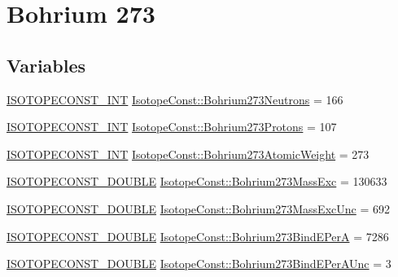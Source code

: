 \hypertarget{group___isotope_const-_bohrium-_bh273}{}\section{Bohrium 273}
\label{group___isotope_const-_bohrium-_bh273}
\subsection*{Variables}
\begin{DoxyCompactItemize}
\item 
\mbox{\hyperlink{group___isotope_const-_macros_ga5f18360b3e99483a35c32d789e62621c}{I\+S\+O\+T\+O\+P\+E\+C\+O\+N\+S\+T\+\_\+\+I\+NT}} \mbox{\hyperlink{group___isotope_const-_bohrium-_bh273_ga2f7fa51ef872b5c4e025e4442e365c8a}{Isotope\+Const\+::\+Bohrium273\+Neutrons}} = 166
\item 
\mbox{\hyperlink{group___isotope_const-_macros_ga5f18360b3e99483a35c32d789e62621c}{I\+S\+O\+T\+O\+P\+E\+C\+O\+N\+S\+T\+\_\+\+I\+NT}} \mbox{\hyperlink{group___isotope_const-_bohrium-_bh273_ga033897448d7788e7ce5f4bf2117a0f76}{Isotope\+Const\+::\+Bohrium273\+Protons}} = 107
\item 
\mbox{\hyperlink{group___isotope_const-_macros_ga5f18360b3e99483a35c32d789e62621c}{I\+S\+O\+T\+O\+P\+E\+C\+O\+N\+S\+T\+\_\+\+I\+NT}} \mbox{\hyperlink{group___isotope_const-_bohrium-_bh273_ga28859630d8dadd8cd270895ba87d6c1b}{Isotope\+Const\+::\+Bohrium273\+Atomic\+Weight}} = 273
\item 
\mbox{\hyperlink{group___isotope_const-_macros_ga8f45a7272ce02c0b4c65c44636ed719a}{I\+S\+O\+T\+O\+P\+E\+C\+O\+N\+S\+T\+\_\+\+D\+O\+U\+B\+LE}} \mbox{\hyperlink{group___isotope_const-_bohrium-_bh273_ga265906a1589c12826012ce2977ab6633}{Isotope\+Const\+::\+Bohrium273\+Mass\+Exc}} = 130633
\item 
\mbox{\hyperlink{group___isotope_const-_macros_ga8f45a7272ce02c0b4c65c44636ed719a}{I\+S\+O\+T\+O\+P\+E\+C\+O\+N\+S\+T\+\_\+\+D\+O\+U\+B\+LE}} \mbox{\hyperlink{group___isotope_const-_bohrium-_bh273_gad4af3af1115bbe3e086f0297dc9b02c8}{Isotope\+Const\+::\+Bohrium273\+Mass\+Exc\+Unc}} = 692
\item 
\mbox{\hyperlink{group___isotope_const-_macros_ga8f45a7272ce02c0b4c65c44636ed719a}{I\+S\+O\+T\+O\+P\+E\+C\+O\+N\+S\+T\+\_\+\+D\+O\+U\+B\+LE}} \mbox{\hyperlink{group___isotope_const-_bohrium-_bh273_ga7611a6a0d62476c6a11b3ee7db3a0c63}{Isotope\+Const\+::\+Bohrium273\+Bind\+E\+PerA}} = 7286
\item 
\mbox{\hyperlink{group___isotope_const-_macros_ga8f45a7272ce02c0b4c65c44636ed719a}{I\+S\+O\+T\+O\+P\+E\+C\+O\+N\+S\+T\+\_\+\+D\+O\+U\+B\+LE}} \mbox{\hyperlink{group___isotope_const-_bohrium-_bh273_gaa55c257a339856430c15f8e1c700dd94}{Isotope\+Const\+::\+Bohrium273\+Bind\+E\+Per\+A\+Unc}} = 3

\end{DoxyCompactItemize}
